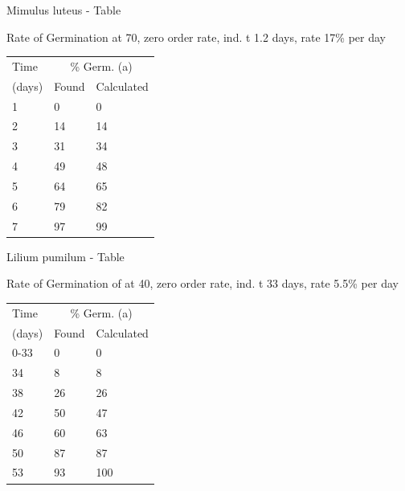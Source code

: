 \begin{table}[h!]
\begin{center}
Mimulus luteus - Table \thetable

Rate of Germination at 70, zero order rate,
ind. t 1.2 days, rate 17\% per day

\end{center}

\begin{tabular}{lll}
\hline
Time      & \multicolumn{2}{c}{\% Germ. (a)} \\
(days)    & Found & Calculated \\
\hline
1 & 0  & 0 \\
2 & 14 & 14\\
3 & 31 & 34\\
4 & 49 & 48\\
5 & 64 & 65\\
6 & 79 & 82\\
7 & 97 & 99\\
\hline
\end{tabular}
\end{table}

\begin{table}[h!]
\begin{center}
Lilium pumilum - Table \thetable

Rate of Germination of at 40, zero order rate,
ind. t 33 days, rate 5.5\% per day
\end{center}

\begin{tabular}{lll}
\hline
Time      & \multicolumn{2}{c}{\% Germ. (a)} \\
(days)    & Found & Calculated \\
\hline
0-33 & 0 & 0 \\
34 & 8 & 8 \\
38 & 26 & 26 \\
42 & 50 & 47 \\
46 & 60 & 63 \\
50 & 87 & 87 \\
53 & 93 & 100 \\
\hline
\end{tabular}
\end{table}

